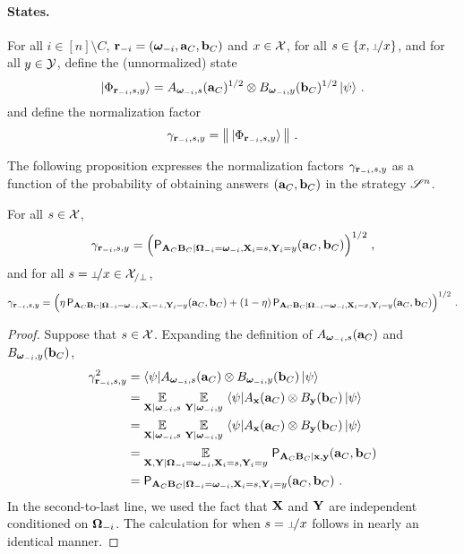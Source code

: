 \paragraph{States.}  For all $i \in [n] \setminus C$, $\mathbf{r}_{-i} = ({\boldsymbol{\omega}}_{-i},\mathbf{a}_C,\mathbf{b}_C)$ and $x \in \mathcal{X}$, for all $s \in \{x,\dummyx\}$, and for all $y \in \mathcal{Y}$, define the (unnormalized) state
\[
	{|\Phi_{\mathbf{r}_{-i},s,y}\rangle} = A_{{\boldsymbol{\omega}}_{-i},s}(\mathbf{a}_C)^{1/2} \otimes B_{{\boldsymbol{\omega}}_{-i},y}(\mathbf{b}_C)^{1/2} \, {|\psi\rangle}~.
\]
and define the normalization factor
\[
	\gamma_{\mathbf{r}_{-i},s,y} = \big \| \, {|\Phi_{\mathbf{r}_{-i},s,y}\rangle} \, \big \|~.
\]

The following proposition expresses the normalization factors $\gamma_{\mathbf{r}_{-i},s,y}$ as a function of the probability of obtaining answers $(\mathbf{a}_C,\mathbf{b}_C)$ in the strategy $\mathscr{S}^n$. 

\begin{proposition}
\label{prop:gamma}
For all $s \in \mathcal{X}$, 
\begin{equation}\label{eq:gamma-def-1}
	\gamma_{\mathbf{r}_{-i},s,y} = \Big( \mathsf{P}_{\mathbf{A}_C \mathbf{B}_C | {\boldsymbol{\Omega}}_{-i} = {\boldsymbol{\omega}}_{-i}, \mathbf{X}_i = s, \mathbf{Y}_i = y}(\mathbf{a}_C,\mathbf{b}_C) \Big)^{1/2}\;,
\end{equation}
and for all $s = \dummyx \in \X_{/\perp}$,
\begin{equation}\label{eq:gamma-def-2}
	\gamma_{\br_\mi,s,y} = \Big( \eta \, \P_{\bA_C \bB_C | \bOmega_\mi = \bomega_\mi, \bX_i = \dummy, \bY_i = y}(\ba_C,\bb_C) + (1 - \eta) \, \P_{\bA_C \bB_C | \bOmega_\mi = \bomega_\mi, \bX_i = x, \bY_i = y}(\ba_C,\bb_C)\Big)^{1/2}~.
\end{equation}
\end{proposition}

\begin{proof}
Suppose that $s \in \mathcal{X}$. Expanding the definition of $ A_{{\boldsymbol{\omega}}_{-i},s}(\mathbf{a}_C)$ and $B_{{\boldsymbol{\omega}}_{-i},y}(\mathbf{b}_C)$,
\begin{align*}
	\gamma_{\mathbf{r}_{-i},s,y}^2 &= {\langle\psi|} A_{{\boldsymbol{\omega}}_{-i},s}(\mathbf{a}_C) \otimes B_{{\boldsymbol{\omega}}_{-i},y}(\mathbf{b}_C) \, {|\psi\rangle} \\
	&= \operatorname*{\mathbb{E}}_{\mathbf{X} | {\boldsymbol{\omega}}_{-i}, s} \, \operatorname*{\mathbb{E}}_{\mathbf{Y} | {\boldsymbol{\omega}}_{-i}, y} \, {\langle\psi|} A_{\mathbf{x}}(\mathbf{a}_C) \otimes B_{\mathbf{y}}(\mathbf{b}_C) \, {|\psi\rangle} \\
	&= \operatorname*{\mathbb{E}}_{\mathbf{X} | {\boldsymbol{\omega}}_{-i}, s} \, \operatorname*{\mathbb{E}}_{\mathbf{Y} | {\boldsymbol{\omega}}_{-i}, y} \, {\langle\psi|} A_{\mathbf{x}}(\mathbf{a}_C) \otimes B_{\mathbf{y}}(\mathbf{b}_C) \, {|\psi\rangle} \\
	&= \operatorname*{\mathbb{E}}_{\mathbf{X}, \mathbf{Y} | {\boldsymbol{\Omega}}_{-i} = {\boldsymbol{\omega}}_{-i}, \mathbf{X}_i = s, \mathbf{Y}_i = y} \, \mathsf{P}_{\mathbf{A}_C \mathbf{B}_C | \mathbf{x}, \mathbf{y}}(\mathbf{a}_C,\mathbf{b}_C) \\
	&= \mathsf{P}_{\mathbf{A}_C \mathbf{B}_C | {\boldsymbol{\Omega}}_{-i} = {\boldsymbol{\omega}}_{-i}, \mathbf{X}_i = s,\mathbf{Y}_i = y}(\mathbf{a}_C,\mathbf{b}_C)~.
\end{align*}
In the second-to-last line, we used the fact that $\mathbf{X}$ and $\mathbf{Y}$ are independent conditioned on ${\boldsymbol{\Omega}}_{-i}$. 
The calculation for when $s = \dummyx$ follows in nearly an identical manner.
\end{proof}

